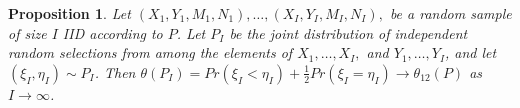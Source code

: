 \documentclass{beamer}
\newcommand{\I}{I}
\renewcommand{\P}{P}
\newcommand{\cind}{\perp \!\!\! \perp}
\newcommand{\aucindiv}{\theta_{11}}%
\newcommand{\aucpop}{\theta_{12}}%
\newcommand{\aucindivhat}{\hat{\theta}_{11}}%
\newcommand{\aucpophat}{\hat{\theta}_{12}}%
\newtheorem{proposition}[theorem]{Proposition}
\newcommand{\speak}[1]{
  \iftoggle{speaktoggle}{
    {\tiny{\textcolor{red}{speak: #1}}\normalsize}
  }
  {}
}
\begin{document}
\begin{frame}
\begin{proposition}
  \label{proposition:aucpop}
  Let $(X_1,Y_1,M_1,N_1),\ldots,(X_\I,Y_\I,M_\I,N_\I),$
    be a random sample of size $\I$ IID according to $\P$. Let $\P_\I$ be
    the joint distribution of independent random selections from
    among the elements of $X_1,\ldots,X_\I,$ and $Y_1,\ldots,Y_\I$, and
    let $(\xi_\I,\eta_\I)\sim\P_\I$. Then
    $\theta(\P_\I)=Pr(\xi_\I<\eta_\I)+\frac{1}{2}Pr(\xi_I=\eta_I) \to \theta_{12}(\P)$
    as $\I\to\infty$.
\end{proposition}
\end{frame}






\end{document}
